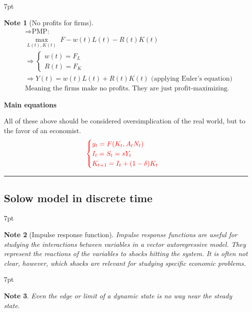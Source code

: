 \documentclass{article}
\newcommand*\sepline{%
  \begin{center}
    \rule[1ex]{.5\textwidth}{.5pt}
  \end{center}}
\newenvironment{blueblock}{
\def\FrameCommand{
  \hspace{1pt}
    {\color{DarkBlue}
    \vrule width 2pt}
    {\color{blueshade}
    \vrule width 4pt}
  \colorbox{blueshade}
}
\MakeFramed{
  \advance
  \hsize-
  \width
  \FrameRestore}
\noindent\hspace{-4.55pt}%
\begin{adjustwidth}{}{7pt}
\vspace{2pt}\vspace{2pt}
}
{\vspace{2pt}\end{adjustwidth}\endMakeFramed}
\newtheorem{note}{Note}
\begin{document}
\begin{blueblock}
\begin{note}[No profits for firms]
\begin{align}
&\Rightarrow \text{PMP:}
\\& \mathop{max}_{L(t),K(t)} \; F-w(t)L(t)-R(t)K(t)
\\&\Rightarrow \begin{cases}
w(t)=F_{L} \\
R(t)=F_{K}\end{cases}
\\&\Rightarrow Y(t)=w(t)L(t)+R(t)K(t) \text{ (applying Euler's equation)}
\\& \text{Meaning the firms make no profits. They are just profit-maximizing.}
\end{align}
\end{note}
\end{blueblock}

\textbf{Main equations} 

All of these above should be considered oversimplication of the real world, but to the favor of an economist. 
\begin{align}
\color{red}
\begin{cases}
y_{t}=F(K_{t},A_{t}N_{t}) \\
I_{t}=S_{t}=sY_{t} \\
K_{t+1}=I_{t}+(1-\delta)K_{t}\end{cases}
\end{align}


\sepline
\subsection{Solow model in discrete
time}\label{solow-model-in-discrete-time}


\begin{blueblock}
\begin{note}[Impulse response function]
Impulse response functions are useful for studying the interactions between variables in a vector autoregressive model. They represent the reactions of the variables to shocks hitting the system. It is often not clear, however, which shocks are relevant for studying specific economic problems.
\end{note}
\end{blueblock}

\begin{blueblock}
\begin{note}
Even the edge or limit of a dynamic state is no way near the steady state.
\end{note}
\end{blueblock}
\end{document}

